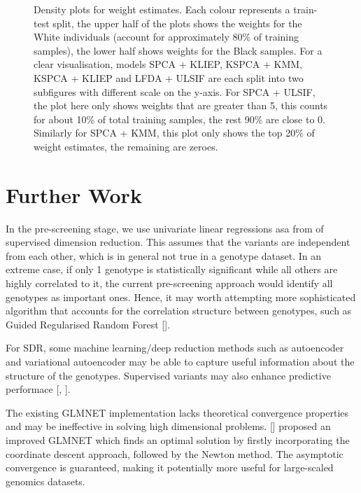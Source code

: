 \documentclass[a4paper,12pt]{article}
\begin{document}
\begin{figure}[H]
\begin{subfigure}{.32\textwidth}
  \label{fig:sfig2}
\end{subfigure} %
\caption{Density plots for weight estimates. Each colour represents a train-test split, the upper half of the plots shows the weights for the White individuals (account for approximately 80\% of training samples), the lower half shows weights for the Black samples. For a clear visualisation, models SPCA + KLIEP, KSPCA + KMM, KSPCA + KLIEP and LFDA + ULSIF are each split into two subfigures with different scale on the y-axis. For SPCA + ULSIF, the plot here only shows weights that are greater than 5, this counts for about 10\% of total training samples, the rest 90\% are close to 0. Similarly for SPCA + KMM, this plot only shows the top 20\% of weight estimates, the remaining are zeroes. }
\label{final figure}
\end{figure} 



%
%
%
%
\pagebreak
\section{Further Work} \label{Further Work}
In the pre-screening stage, we use univariate linear regressions asa from of supervised dimension reduction. This assumes that the variants are independent from each other, which is in general not true in a genotype dataset. In an extreme case, if only 1 genotype is statistically significant while all others are highly correlated to it, the current pre-screening approach would identify all genotypes as important ones. Hence, it may worth attempting more  sophisticated algorithm that accounts for the correlation structure between genotypes, such as Guided Regularised Random Forest [\cite{deng2013gene}].

For SDR, some machine learning/deep reduction methods such as autoencoder and variational autoencoder may be able to capture useful information about the structure of the genotypes. Supervised variants may also enhance predictive performace [\cite{ghosh2020supervised}, \cite{le2018supervised}].

The existing GLMNET implementation lacks theoretical convergence properties and may be ineffective in solving high dimensional problems. [\cite{yuan2012improved}] proposed an improved GLMNET which finds an optimal solution by firstly incorporating the coordinate descent approach, followed by the Newton method. The asymptotic convergence is guaranteed,  making it potentially more useful for large-scaled genomics datasets.
\end{document}
